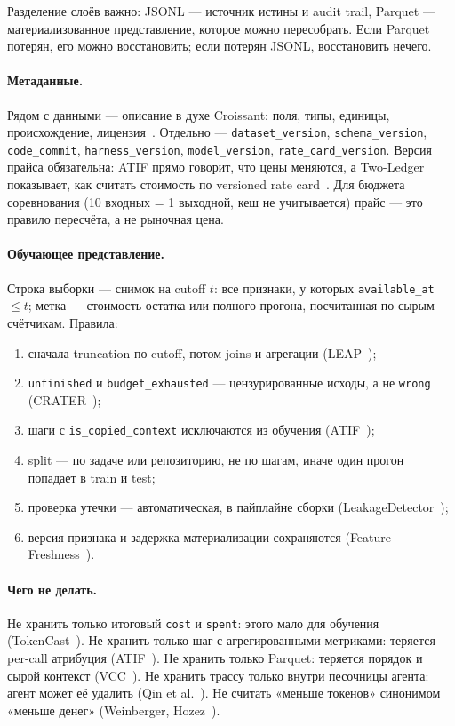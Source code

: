\documentclass[11pt,a4paper]{article}
\begin{document}
Разделение слоёв важно: JSONL — источник истины и audit trail, Parquet —
материализованное представление, которое можно пересобрать. Если Parquet
потерян, его можно восстановить; если потерян JSONL, восстановить нечего.

\paragraph{Метаданные.}
Рядом с данными — описание в духе Croissant: поля, типы, единицы,
происхождение, лицензия~\cite{akhtar2024croissant}. Отдельно —
\texttt{dataset\_version}, \texttt{schema\_version}, \texttt{code\_commit},
\texttt{harness\_version}, \texttt{model\_version}, \texttt{rate\_card\_version}.
Версия прайса обязательна: ATIF прямо говорит, что цены меняются, а
Two-Ledger показывает, как считать стоимость по versioned rate
card~\cite{atif2026,acharya2026twoledger}. Для бюджета соревнования
(10 входных = 1 выходной, кеш не учитывается) прайс — это правило
пересчёта, а не рыночная цена.

\paragraph{Обучающее представление.}
Строка выборки — снимок на cutoff $t$: все признаки, у которых
\texttt{available\_at} $\le t$; метка — стоимость остатка или полного
прогона, посчитанная по сырым счётчикам. Правила:

\begin{enumerate}
  \item сначала truncation по cutoff, потом joins и агрегации
        (LEAP~\cite{le2026leap});
  \item \texttt{unfinished} и \texttt{budget\_exhausted} — цензурированные
        исходы, а не \texttt{wrong} (CRATER~\cite{jiang2026crater});
  \item шаги с \texttt{is\_copied\_context} исключаются из обучения
        (ATIF~\cite{atif2026});
  \item split — по задаче или репозиторию, не по шагам, иначе один прогон
        попадает в train и test;
  \item проверка утечки — автоматическая, в пайплайне сборки
        (LeakageDetector~\cite{alomar2025leakagedetector});
  \item версия признака и задержка материализации сохраняются
        (Feature Freshness~\cite{rajula2026freshness}).
\end{enumerate}

\paragraph{Чего не делать.}
Не хранить только итоговый \texttt{cost} и \texttt{spent}: этого мало для
обучения (TokenCast~\cite{ouyang2026tokencast}). Не хранить только шаг с
агрегированными метриками: теряется per-call атрибуция
(ATIF~\cite{atif2026}). Не хранить только Parquet: теряется порядок и
сырой контекст (VCC~\cite{zhang2026vcc}). Не хранить трассу только внутри
песочницы агента: агент может её удалить (Qin et al.~\cite{qin2026tamper}).
Не считать «меньше токенов» синонимом «меньше денег»
(Weinberger, Hozez~\cite{weinberger2026tokenreduction}).
\end{document}
